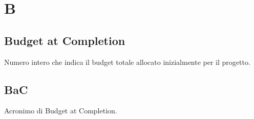 \section{B}
\subsection{Budget at Completion}%
Numero intero che indica il budget totale allocato inizialmente per il progetto.
\subsection{BaC}%
Acronimo di Budget at Completion.
\clearpage